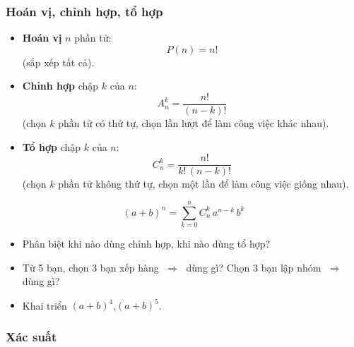 \documentclass[12pt,a4paper]{article}
\begin{document}
\subsubsection{Hoán vị, chỉnh hợp, tổ hợp}

\begin{congthuc}[title={Hoán vị, chỉnh hợp, tổ hợp}]
  \begin{itemize}
    \item \textbf{Hoán vị} $n$ phần tử:
      \[
        P(n) = n!
      \]
      (sắp xếp tất cả).
    \item \textbf{Chỉnh hợp} chập $k$ của $n$:
      \[
        A_n^k = \dfrac{n!}{(n - k)!}
      \]
      (chọn $k$ phần tử có thứ tự, chọn lần lượt để làm công việc khác nhau).
    \item \textbf{Tổ hợp} chập $k$ của $n$:
      \[
        C_n^k = \dfrac{n!}{k!\,(n - k)!}
      \]
      (chọn $k$ phần tử không thứ tự, chọn một lần để làm công việc giống nhau).
  \end{itemize}
\end{congthuc}

\begin{congthuc}[title={Nhị thức Newton}]
  \[
    (a + b)^n = \sum_{k=0}^{n} C_n^k\, a^{n-k}\, b^k
  \]
\end{congthuc}

\begin{vidu}
  \begin{itemize}
    \item Phân biệt khi nào dùng chỉnh hợp, khi nào dùng tổ hợp?
    \item Từ 5 bạn, chọn 3 bạn xếp hàng $\;\Rightarrow\;$ dùng gì? Chọn 3 bạn lập nhóm $\;\Rightarrow\;$ dùng gì?
    \item Khai triển $(a + b)^4$,\quad $(a + b)^5$.
  \end{itemize}
\end{vidu}

\subsubsection{Xác suất}
\end{document}
